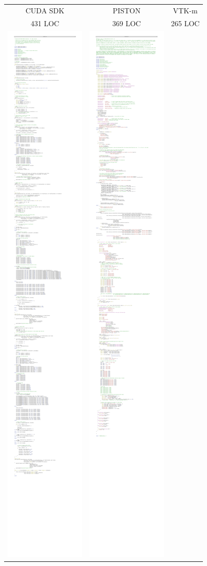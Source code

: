 \begin{figure}[htb]
  \centering
  \begin{tabular}{ccc}
    CUDA SDK & PISTON & VTK-m \\
    {\small 431 LOC} & {\small 369 LOC} & {\small 265 LOC} \\
    \includegraphics[width=.75in]{images/MCCompareCuda} &
    \includegraphics[width=.75in]{images/MCComparePiston} &

\end{tabular}
\end{figure}
